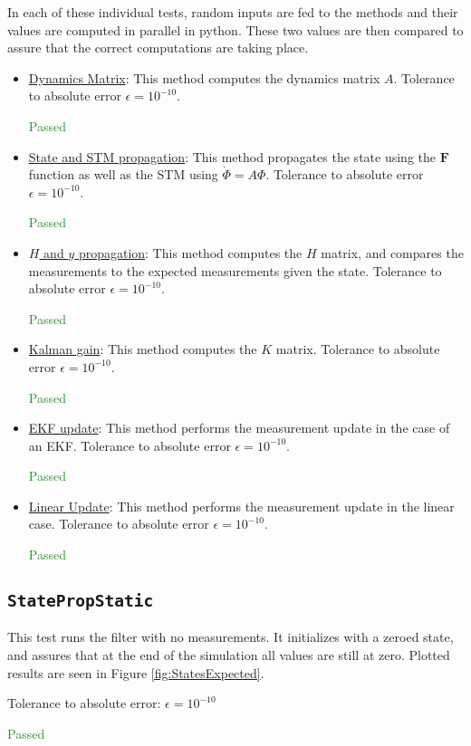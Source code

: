 \documentclass[]{BasiliskReportMemo}
\begin{document}
In each of these individual tests, random inputs are fed to the methods and their values are computed in parallel in python. These two values are then compared to assure that the correct computations are taking place. 
\begin{itemize}
\item \underline{Dynamics Matrix}: This method computes the dynamics matrix $A$. Tolerance to absolute error $\epsilon = 10^{-10}$.

\textcolor{ForestGreen}{Passed}
\item \underline{State and STM propagation}: This method propagates the state using the $\bm F$ function as well as the STM using $\dot{\Phi} = A \Phi$. Tolerance to absolute error $\epsilon = 10^{-10}$.

\textcolor{ForestGreen}{Passed}
\item \underline{$H$ and $y$ propagation}: This method computes the $H$ matrix, and compares the measurements to the expected measurements given the state. Tolerance to absolute error $\epsilon = 10^{-10}$.

\textcolor{ForestGreen}{Passed}
\item \underline{Kalman gain}: This method computes the $K$ matrix. Tolerance to absolute error $\epsilon = 10^{-10}$.

\textcolor{ForestGreen}{Passed}
\item \underline{EKF update}: This method performs the measurement update in the case of an EKF. Tolerance to absolute error $\epsilon = 10^{-10}$.

\textcolor{ForestGreen}{Passed}
\item \underline{Linear Update}: This method performs the measurement update in the linear case. Tolerance to absolute error $\epsilon = 10^{-10}$.

\textcolor{ForestGreen}{Passed}
\end{itemize}

\subsection{\texttt{StatePropStatic}}

This test runs the filter with no measurements. It initializes with a zeroed state, and assures that at the end of the simulation all values are still at zero. Plotted results are seen in Figure \ref{fig:StatesExpected}.

Tolerance to absolute error: $\epsilon = 10^{-10}$

\textcolor{ForestGreen}{Passed}
\end{document}
